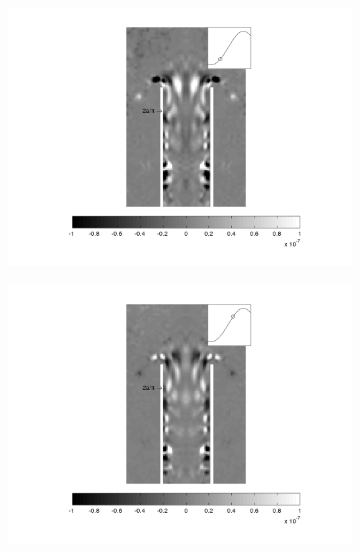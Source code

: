 \begin{landscape}
\begin{figure}[ht!]
\begin{subfigure}{0.55 \textwidth}
  \caption[]{}
  \label{fig:max_007_2}
\end{subfigure}
\begin{subfigure}{0.55 \textwidth}
  \includegraphics[width=1.\linewidth]{figuras/max_ka_007_3.png}
  \caption[]{}
  \label{fig:max_007_3}
\end{subfigure}
\par\medskip
\begin{subfigure}{0.55 \textwidth}
  \includegraphics[width=1.\linewidth]{figuras/max_ka_007_4.png}
  \caption[]{}
  \label{fig:max_007_4}
\end{subfigure}
\begin{subfigure}{0.55 \textwidth}

\end{subfigure}
\end{figure}
\end{landscape}
